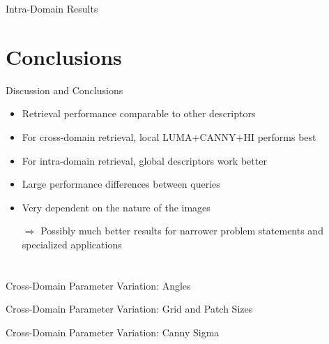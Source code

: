 \documentclass[mathserif]{beamer}
\begin{document}
\begin{frame}{Intra-Domain Results}
    \begin{figure}
        
    \end{figure}
\end{frame}

\section{Conclusions}
\begin{frame}{Discussion and Conclusions}
    \begin{itemize}
        \item Retrieval performance comparable to other descriptors
        \item For cross-domain retrieval, local LUMA+CANNY+HI performs best
        \item For intra-domain retrieval, global descriptors work better
        \item Large performance differences between queries
        \item Very dependent on the nature of the images
        \item[$\Rightarrow$] Possibly much better results for narrower problem statements and specialized applications
    \end{itemize}
\end{frame}

\appendix
\section{\appendixname}
\begin{frame}{Cross-Domain Parameter Variation: Angles}
    \begin{table}
        \centering
        \resultsparameterangles
    \end{table}
\end{frame}

\begin{frame}{Cross-Domain Parameter Variation: Grid and Patch Sizes}
    \begin{table}
        \centering
        \resultsparametergrid
    \end{table}
\end{frame}

\begin{frame}{Cross-Domain Parameter Variation: Canny Sigma}
    \begin{table}
        \centering
        \resultsparametercanny
    \end{table}
\end{frame}


\end{document}
